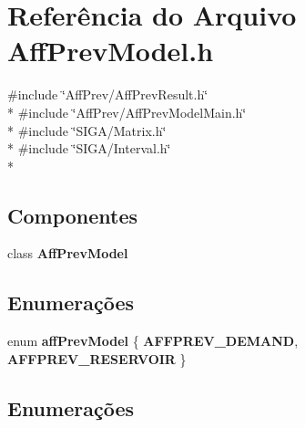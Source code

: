 \section{Referência do Arquivo Aff\+Prev\+Model.\+h}
\label{_aff_prev_model_8h}
{\ttfamily \#include \char`\"{}Aff\+Prev/\+Aff\+Prev\+Result.\+h\char`\"{}}\\*
{\ttfamily \#include \char`\"{}Aff\+Prev/\+Aff\+Prev\+Model\+Main.\+h\char`\"{}}\\*
{\ttfamily \#include \char`\"{}S\+I\+G\+A/\+Matrix.\+h\char`\"{}}\\*
{\ttfamily \#include \char`\"{}S\+I\+G\+A/\+Interval.\+h\char`\"{}}\\*
\subsection*{Componentes}
\begin{DoxyCompactItemize}
\item 
class {\bf Aff\+Prev\+Model}
\end{DoxyCompactItemize}
\subsection*{Enumerações}
\begin{DoxyCompactItemize}
\item 
enum {\bf aff\+Prev\+Model} \{ {\bf A\+F\+F\+P\+R\+E\+V\+\_\+\+D\+E\+M\+A\+ND}, 
{\bf A\+F\+F\+P\+R\+E\+V\+\_\+\+R\+E\+S\+E\+R\+V\+O\+IR}
 \}
\end{DoxyCompactItemize}


\subsection{Enumerações}
